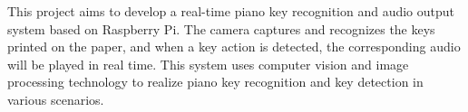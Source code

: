 This project aims to develop a real-\/time piano key recognition and audio output system based on Raspberry Pi. The camera captures and recognizes the keys printed on the paper, and when a key action is detected, the corresponding audio will be played in real time. This system uses computer vision and image processing technology to realize piano key recognition and key detection in various scenarios. 